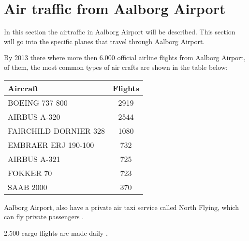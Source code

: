 \section{Air traffic from Aalborg Airport}

In this section the airtraffic in Aalborg Airport will be described. This section will go into the specific planes that travel through Aalborg Airport.


By 2013 there where more then 6.000 official airline flights from Aalborg Airport, of them, the most common types of air crafts are shown in the table below:

\begin{center}
    \begin{tabular}{ | l | c | }
        \hline
        Aircraft & Flights\\ \hline
        BOEING 737-800 & 2919\\ \hline
        AIRBUS A-320 & 2544\\ \hline
        FAIRCHILD DORNIER 328 & 1080\\ \hline
        EMBRAER ERJ 190-100 & 732\\ \hline
        AIRBUS A-321 & 725\\ \hline
        FOKKER 70 & 723\\ \hline
        SAAB 2000 & 370\\ \hline
    \end{tabular}
\end{center}


Aalborg Airport, also have a private air taxi service called North Flying, which can fly private passengers \cite{north_flying}.

2.500 cargo flights are made daily \cite{cargo_lufthavn}.

